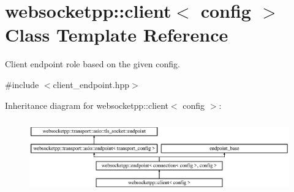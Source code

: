 \hypertarget{classwebsocketpp_1_1client}{}\section{websocketpp\+:\+:client$<$ config $>$ Class Template Reference}
\label{classwebsocketpp_1_1client}


Client endpoint role based on the given config.  




{\ttfamily \#include $<$client\+\_\+endpoint.\+hpp$>$}

Inheritance diagram for websocketpp\+:\+:client$<$ config $>$\+:\begin{figure}[H]
\begin{center}
\leavevmode
\includegraphics[height=3.218391cm]{classwebsocketpp_1_1client}
\end{center}
\end{figure}
